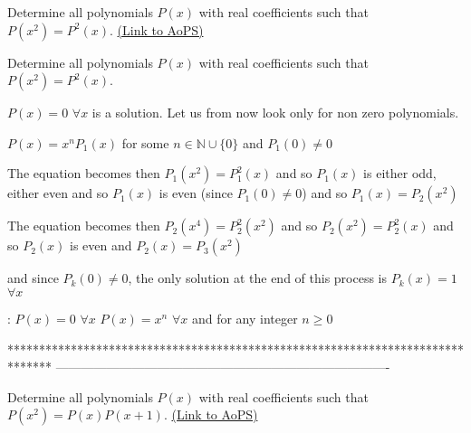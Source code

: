 \begin{problem}
	Determine all polynomials $ P(x) $ with real coefficients such that $ P(x^2)=P^2(x) $.
	\flushright \href{https://artofproblemsolving.com/community/c6h476928}{(Link to AoPS)}
\end{problem}



\begin{solution}
	\begin{tcolorbox}Determine all polynomials $ P(x) $ with real coefficients such that $ P(x^2)=P^2(x) $.\end{tcolorbox}
$P(x)=0$ $\forall x$ is a solution. Let us from now look only for non zero polynomials.

$P(x)=x^nP_1(x)$ for some $n\in\mathbb N\cup\{0\}$ and $P_1(0)\ne 0$

The equation becomes then $P_1(x^2)=P_1^2(x)$ and so $P_1(x)$ is either odd, either even and so $P_1(x)$ is even (since $P_1(0)\ne 0$) and so $P_1(x)=P_2(x^2)$

The equation becomes then $P_2(x^4)=P_2^2(x^2)$ and so $P_2(x^2)=P_2^2(x)$ and so $P_2(x)$ is even and $P_2(x)=P_3(x^2)$

and since $P_k(0)\ne 0$, the only solution at the end of this process is $P_k(x)=1$ $\forall x$

 :
$P(x)=0$ $\forall x$
$P(x)=x^n$ $\forall x$ and for any integer $n\ge 0$
\end{solution}
*******************************************************************************
-------------------------------------------------------------------------------

\begin{problem}
	Determine all polynomials $ P(x) $ with real coefficients such that $ P(x^2)=P(x)P(x+1) $.
	\flushright \href{https://artofproblemsolving.com/community/c6h476929}{(Link to AoPS)}
\end{problem}



